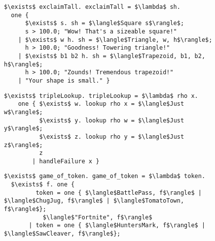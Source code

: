 \documentclass[manuscript,screen,review, 12pt, nonacm]{acmart}
\begin{document}
    \begin{figure}[ht] 
        \begin{minipage}[h]{0.54\linewidth}
          \verselst
          \begin{lstlisting}[numbers=none, basicstyle=\tiny, xleftmargin=.2em,
                            showstringspaces=false,
                            frame=single]
$\exists$ exclaimTall. exclaimTall = $\lambda$ sh. 
  one { 
      $\exists$ s. sh = $\langle$Square s$\rangle$; 
      s > 100.0; "Wow! That's a sizeable square!"
    | $\exists$ w h. sh = $\langle$Triangle, w, h$\rangle$; 
      h > 100.0; "Goodness! Towering triangle!"
    | $\exists$ b1 b2 h. sh = $\langle$Trapezoid, b1, b2, h$\rangle$;
      h > 100.0; "Zounds! Tremendous trapezoid!"
    | "Your shape is small." }
            \end{lstlisting}
            \label{fig:verseexclaimtall} 
        \end{minipage}%
        \begin{minipage}[h]{0.5\linewidth}
          \verselst
          \begin{lstlisting}[numbers=none, basicstyle=\tiny, xleftmargin=2em,
                        frame=single]
$\exists$ tripleLookup. tripleLookup = $\lambda$ rho x. 
    one { $\exists$ w. lookup rho x = $\langle$Just w$\rangle$; 
          $\exists$ y. lookup rho w = $\langle$Just y$\rangle$; 
          $\exists$ z. lookup rho y = $\langle$Just z$\rangle$;
          z
        | handleFailure x }
          \end{lstlisting}
            \label{fig:versetriplelookup} 
        \vspace{4ex}
        \end{minipage} 
        \begin{minipage}[h]{\linewidth}
          \verselst
          \begin{lstlisting}[numbers=none, basicstyle=\tiny, xleftmargin=9em, 
                            frame=single, showstringspaces=false]
$\exists$ game_of_token. game_of_token = $\lambda$ token. 
  $\exists$ f. one {
         token = one { $\langle$BattlePass, f$\rangle$ | $\langle$ChugJug, f$\rangle$ | $\langle$TomatoTown, f$\rangle$}; 
           $\langle$"Fortnite", f$\rangle$
       | token = one { $\langle$HuntersMark, f$\rangle$ | $\langle$SawCleaver, f$\rangle$}; 

\end{lstlisting}
\end{minipage}
\end{figure}
\end{document}
